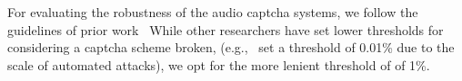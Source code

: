 For evaluating the robustness of the 
audio captcha systems, we follow the guidelines of prior work~\cite{bursztein2011failure}
While other researchers have set lower thresholds for considering a captcha scheme 
broken, (e.g.,~\cite{Chellapilla} set a threshold of 0.01\% due to the scale of 
automated attacks), we opt for the more lenient threshold of of 1\%.
